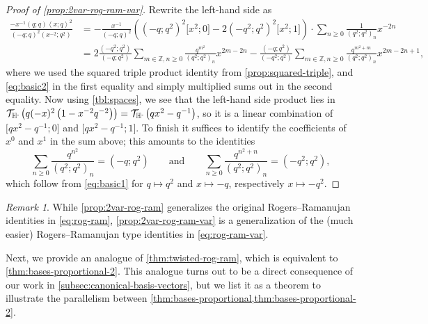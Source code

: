 \documentclass[reqno,11pt]{amsart}
\theoremstyle{definition}
\theoremstyle{remark}
\newtheorem*{remark}{Remark}
\numberwithin{equation}{section}
\newcommand{\Z}{\mathbb{Z}}
\newcommand{\Hminus}{{\mathbb{H}^{\textnormal{-}\hspace{-0.03cm}}}}
\newcommand{\mT}{\mathcal{T}}
\newcommand{\la}{\left\langle}
\newcommand{\ra}{\right\rangle}
\newcommand{\vect}[2]{\big[{#1};{#2}\big]}
\begin{document}
\begin{proof}[Proof of \cref{prop:2var-rog-ram-var}]
Rewrite the left-hand side as 
\[
\begin{aligned}
    \frac{-x^{-1} (q; q)\la x; q\ra^2}{(-q; q)^2\left( x^{-2}; q^2\right)}
    &= 
    -\frac{x^{-1}}{(-q; q)^2} \left(\left(-q; q^2\right)^2 \vect{x^2}{0} - 2\left(-q^2; q^2\right)^2\vect{x^2}{1}\right) \cdot \sum_{n \ge 0} \frac{1}{\left(q^2; q^2\right)_n} x^{-2n}
    \\
    &= 2\frac{\left(-q^2; q^2\right)}{\left(-q; q^2\right)} \sum_{m \in \Z, n \ge 0} \frac{q^{m^2}}{(q^2; q^2)_n}x^{2m-2n} - \frac{\left(-q; q^2\right)}{\left(-q^2; q^2\right)} \sum_{m \in \Z, n \ge 0} \frac{q^{m^2+m}}{(q^2; q^2)_n}x^{2m-2n+1},
\end{aligned}
\]
where we used the squared triple product identity from \cref{prop:squared-triple}, and \cref{eq:basic2} in the first equality and simply multiplied sums out in the second equality. Now using \cref{tbl:spaces}, we see that the left-hand side product lies in $\mT_\Hminus\left(q(-x)^2 \left(1 - x^{-2} q^{-2}\right)\right) = \mT_\Hminus\left(qx^2 - q^{-1}\right)$, so it is a linear combination of $\vect{qx^2-q^{-1}}{0}$ and $\vect{qx^2-q^{-1}}{1}$. To finish it suffices to identify the coefficients of $x^0$ and $x^1$ in the sum above; this amounts to the identities
\begin{equation} \label{eq:rog-ram-var}
    \sum_{n \ge 0} \frac{q^{n^2}}{(q^2; q^2)_n} = \left(-q; q^2\right) \qquad\text{and}\qquad 
    \sum_{n \ge 0} \frac{q^{n^2+n}}{(q^2; q^2)_n} = \left(-q^2; q^2\right),
\end{equation}
which follow from \cref{eq:basic1} for $q \mapsto q^2$ and $x \mapsto -q$, respectively $x \mapsto -q^2$.
\end{proof}
\begin{remark}
While \cref{prop:2var-rog-ram} generalizes the original Rogers--Ramanujan identities in \cref{eq:rog-ram}, \cref{prop:2var-rog-ram-var} is a generalization of the (much easier) Rogers--Ramanujan type identities in \cref{eq:rog-ram-var}.
\end{remark}

Next, we provide an analogue of \cref{thm:twisted-rog-ram}, which is equivalent to \cref{thm:bases-proportional-2}. This analogue turns out to be a direct consequence of our work in \cref{subsec:canonical-basis-vectors}, but we list it as a theorem to illustrate the parallelism between \cref{thm:bases-proportional,thm:bases-proportional-2}.
\end{document}
